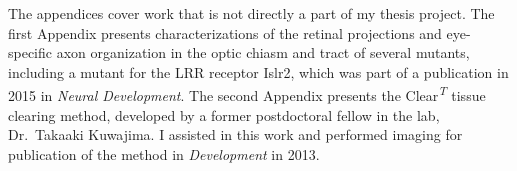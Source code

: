 The appendices cover work that is not directly a part of my thesis project.
The first Appendix presents characterizations of the retinal projections and eye-specific axon organization in the optic chiasm and tract of several mutants, including a mutant for the LRR receptor Islr2, which was part of a publication in 2015 in \emph{Neural Development}.
The second Appendix presents the Clear\textsuperscript{\emph{T}} tissue clearing method, developed by a former postdoctoral fellow in the lab, Dr.~Takaaki Kuwajima.
I assisted in this work and performed imaging for publication of the method in \emph{Development} in 2013.
